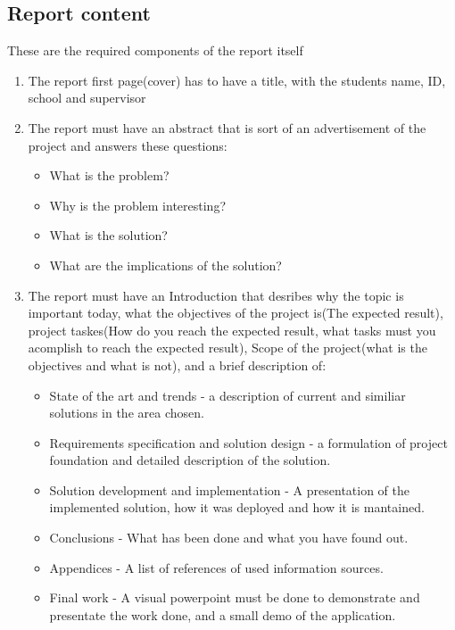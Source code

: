 \documentclass{article}
\begin{document}
  \subsection{Report content}
  These are the required components of the report itself
  \begin{enumerate}
    \item The report first page(cover) has to have a title, with the students name, ID, school and supervisor
    \item The report must have an abstract that is sort of an advertisement of the project and answers these questions:
    \begin{itemize}
        \item What is the problem?
        \item Why is the problem interesting?
        \item What is the solution?
        \item What are the implications of the solution?
    \end{itemize}
    \item The report must have an Introduction that desribes why the topic is important today, what the objectives of the project is(The expected result), project taskes(How do you reach the expected result, what tasks must you acomplish to reach the expected result), Scope of the project(what is the objectives and what is not), and a brief description of:
    \begin{itemize}
        \item State of the art and trends - a description of current and similiar solutions in the area chosen.
        \item Requirements specification and solution design - a formulation of project foundation and detailed description of the solution.
        \item Solution development and implementation - A presentation of the implemented solution, how it was deployed and how it is mantained.
        \item Conclusions - What has been done and what you have found out.
        \item Appendices - A list of references of used information sources.
        \item Final work - A visual powerpoint must be done to demonstrate and presentate the work done, and a small demo of the application.
    \end{itemize}
  \end{enumerate}
  \cite{bachelorProject} 


\end{document}
